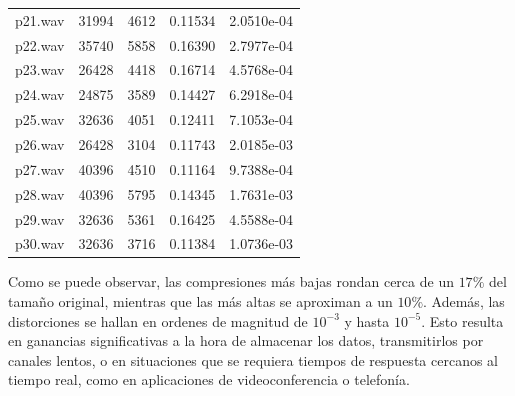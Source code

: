 \documentclass[a4paper,11pt]{article}
\begin{document}
\begin{center}
\begin{tabular}{c | c | c | c | c}
        p21.wav & 31994 & 4612 & 0.11534 & 2.0510e-04\\
        p22.wav & 35740 & 5858 & 0.16390 & 2.7977e-04\\
        p23.wav & 26428 & 4418 & 0.16714 & 4.5768e-04\\
        p24.wav & 24875 & 3589 & 0.14427 & 6.2918e-04\\
        p25.wav & 32636 & 4051 & 0.12411 & 7.1053e-04\\
        p26.wav & 26428 & 3104 & 0.11743 & 2.0185e-03\\
        p27.wav & 40396 & 4510 & 0.11164 & 9.7388e-04\\
        p28.wav & 40396 & 5795 & 0.14345 & 1.7631e-03\\
        p29.wav & 32636 & 5361 & 0.16425 & 4.5588e-04\\
        p30.wav & 32636 & 3716 & 0.11384 & 1.0736e-03\\
        \hline
    \end{tabular}
\end{center}

Como se puede observar, las compresiones más bajas rondan cerca de un $17\%$
del tamaño original, mientras que las más altas se aproximan a un $10\%$.
Además, las distorciones se hallan en ordenes de magnitud de $10^{-3}$ y hasta
$10^{-5}$. Esto resulta en ganancias significativas a la hora de almacenar los
datos, transmitirlos por canales lentos, o en situaciones que se requiera
tiempos de respuesta cercanos al tiempo real, como en aplicaciones de
videoconferencia o telefonía.
\end{document}

